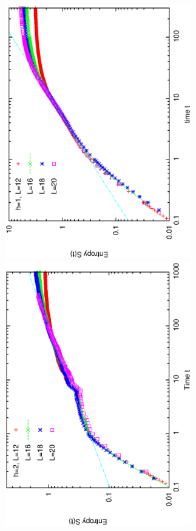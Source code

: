 \documentclass[prl,aps,epsf,showpacs,twocolumn]{revtex4}
\begin{document}
\begin{figure}[b]
  \includegraphics[angle=-90,width=3.2in]{newfig1c.ps}\\
  \vspace{-0.10in}
  \includegraphics[angle=-90,width=3.2in]{newfig1d.ps}\\
  \hspace{0.0in}
  \vspace{-0.3in}

\end{figure}
\end{document}
